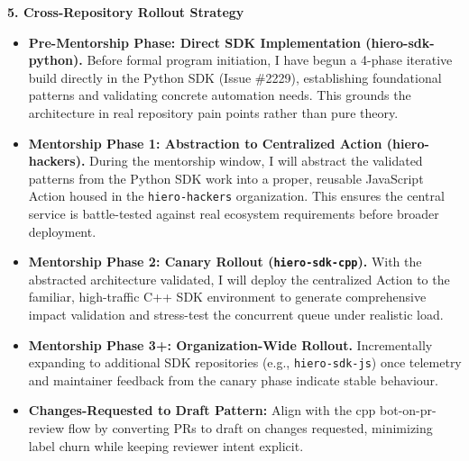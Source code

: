 \documentclass[11pt]{article}
\newcommand{\mainheading}[1]{\par\vspace{10pt}\noindent{\fontsize{15pt}{18pt}\selectfont\textcolor{headingblue}{#1}}
\par\vspace{4pt}}
\begin{document}
\vspace{5pt}
\noindent
\textbf{5. Cross-Repository Rollout Strategy}
\begin{itemize}[leftmargin=18pt,itemsep=2pt,topsep=0pt]
    \item \textbf{Pre-Mentorship Phase: Direct SDK Implementation (hiero-sdk-python).} Before formal program initiation, I have begun a 4-phase iterative build directly in the Python SDK (Issue \#2229), establishing foundational patterns and validating concrete automation needs. This grounds the architecture in real repository pain points rather than pure theory.
    \item \textbf{Mentorship Phase 1: Abstraction to Centralized Action (hiero-hackers).} During the mentorship window, I will abstract the validated patterns from the Python SDK work into a proper, reusable JavaScript Action housed in the \texttt{hiero-hackers} organization. This ensures the central service is battle-tested against real ecosystem requirements before broader deployment.
    \item \textbf{Mentorship Phase 2: Canary Rollout (\texttt{hiero-sdk-cpp}).} With the abstracted architecture validated, I will deploy the centralized Action to the familiar, high-traffic C++ SDK environment to generate comprehensive impact validation and stress-test the concurrent queue under realistic load.
    \item \textbf{Mentorship Phase 3+: Organization-Wide Rollout.} Incrementally expanding to additional SDK repositories (e.g., \texttt{hiero-sdk-js}) once telemetry and maintainer feedback from the canary phase indicate stable behaviour.
    \item \textbf{Changes-Requested to Draft Pattern:} Align with the cpp bot-on-pr-review flow by converting PRs to draft on changes requested, minimizing label churn while keeping reviewer intent explicit.
\end{itemize}

\mainheading{8. Implementation Plan \& Milestones}

\end{document}
